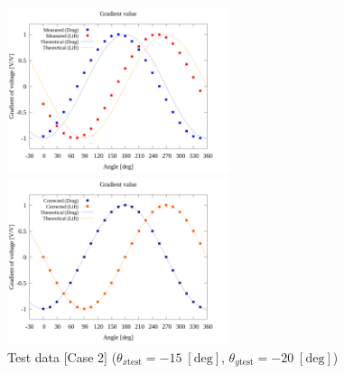\begin{figure}[htbp]
  \begin{minipage}[b]{0.45\linewidth}
    \centering
    \includegraphics[width=65mm]{../../02_workspace/result/rotation_tx=-15.0_ty=-20.0/plot/20/20_adjust-value.png}
  \end{minipage}
  \begin{minipage}[b]{0.45\linewidth}
    \centering
    \includegraphics[width=65mm]{../../02_workspace/result/rotation_tx=-15.0_ty=-20.0/plot/21/21-4_summary.png}
  \end{minipage}
  \caption{Test data [Case 2] ($\theta_{x \mathrm{test}} = -15 \; \mathrm{[deg]}$, $\theta_{y \mathrm{test}} = -20 \; \mathrm{[deg]}$)}
\end{figure}

